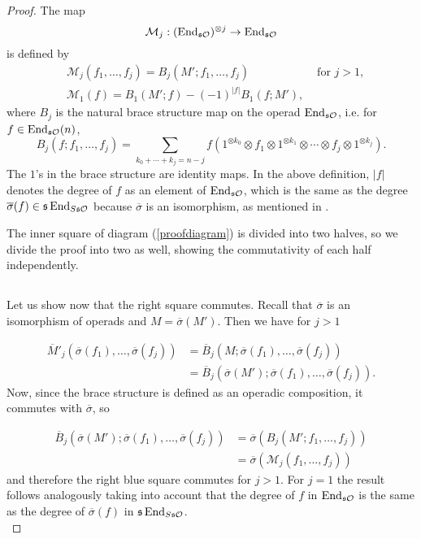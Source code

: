 \documentclass[Thesis.tex]{subfiles}
\begin{document}
\begin{proof}
 The map 
\[\mathcal{M}_j:(\operatorname{End}_{\mathfrak{s}{\mathcal O}})^{\otimes j}\to\operatorname{End}_{\mathfrak{s}{\mathcal O}}\]
is defined by 
\begin{align*}
&\mathcal{M}_j(f_1, \dots, f_j)=B_j(M';f_1,\dots, f_j) &\text{ for }j>1,\\
&\mathcal{M}_1(f)=B_1(M';f)-(-1)^{|f|}B_1(f;M'),
\end{align*}
 where $B_j$ is the natural brace structure map on the operad $\operatorname{End}_{\mathfrak{s}{\mathcal O}}$, i.e. for $f\in\operatorname{End}_{\mathfrak{s}{\mathcal O}}(n)$, 
\[B_j(f;f_1,\dots, f_j)=\sum_{k_0+\cdots+k_j=n-j} f(1^{\otimes k_0}\otimes f_1\otimes 1^{\otimes k_1}\otimes\cdots\otimes f_j\otimes 1^{\otimes k_j}).\]
 The $1$'s in the brace structure are identity maps. In the above definition, $|f|$ denotes the degree of $f$ as an element of $\operatorname{End}_{\mathfrak{s}{\mathcal O}}$, which is the same as the degree $\overline{\sigma}(f)\in \mathfrak{s}\operatorname{End}_{S\mathfrak{s}{\mathcal O}}$ because $\overline{\sigma}$ is an isomorphism, as mentioned in .  %
 
 The inner square  of diagram (\ref{proofdiagram}) is divided into two halves, so we divide the proof into two as well, showing the commutativity of each half independently.
 \subsection*{ }
 Let us show now that the right square commutes. Recall that $\overline{\sigma}$ is an isomorphism of operads and $M=\overline{\sigma}(M')$. Then we have for $j>1$
 
 \begin{align*}
 \overline{M}'_j(\overline{\sigma}(f_1),\dots,\overline{\sigma}(f_j))&=\overline{B}_j(M;\overline{\sigma}(f_1),\dots,\overline{\sigma}(f_j))\\
 &=\overline{B}_j(\overline{\sigma}(M');\overline{\sigma}(f_1),\dots,\overline{\sigma}(f_j)).
 \end{align*}
 Now, since the brace structure is defined as an operadic composition, it commutes with $\overline{\sigma}$, so
 
 \begin{align*}
 \overline{B}_j(\overline{\sigma}(M');\overline{\sigma}(f_1),\dots,\overline{\sigma}(f_j))&=\overline{\sigma}(B_j(M';f_1,\dots, f_j))\\
&=\overline{\sigma}(\mathcal{M}_j(f_1,\dots, f_j))
  \end{align*}
 and therefore the right blue square commutes for $j>1$. For $j=1$ the result follows analogously taking into account that the degree of $f$ in $\operatorname{End}_{\mathfrak{s}{\mathcal O}}$ is the same as the degree of $\overline{\sigma}(f)$ in $\mathfrak{s}\operatorname{End}_{S\mathfrak{s}{\mathcal O}}$.\\
 



\end{proof}
\end{document}
